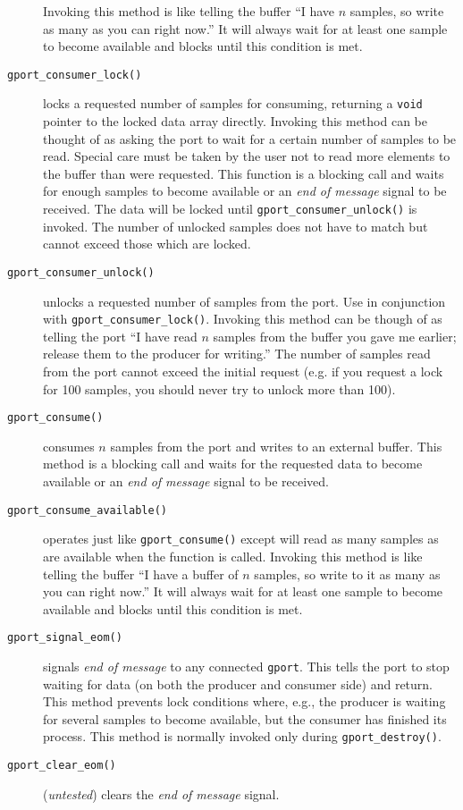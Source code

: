 \begin{description}
    Invoking this method is like telling the buffer ``I have $n$ samples, so
    write as many as you can right now.''
    It will always wait for at least one sample to become available and blocks
    until this condition is met.
\item[{\tt gport\_consumer\_lock()}]
    locks a requested number of samples for consuming, returning a {\tt void}
    pointer to the locked data array directly.
    Invoking this method can be thought of as asking the port to wait for a
    certain number of samples to be read.
    Special care must be taken by the user not to read more elements to the
    buffer than were requested.
    This function is a blocking call and waits for enough samples to become
    available or an {\it end of message} signal to be received.
    The data will be locked until {\tt gport\_consumer\_unlock()} is invoked.
    The number of unlocked samples does not have to match but cannot exceed
    those which are locked.
\item[{\tt gport\_consumer\_unlock()}]
    unlocks a requested number of samples from the port.
    Use in conjunction with {\tt gport\_consumer\_lock()}.
    Invoking this method can be though of as telling the port ``I have read
    $n$ samples from the buffer you gave me earlier; release them to the
    producer for writing.''
    The number of samples read from the port cannot exceed the initial
    request (e.g. if you request a lock for 100 samples, you should never try
    to unlock more than 100).
\item[{\tt gport\_consume()}]
    consumes $n$ samples from the port and writes to an external buffer.
    This method is a blocking call and waits for the requested data to become
    available or an {\it end of message} signal to be received.
\item[{\tt gport\_consume\_available()}]
    operates just like {\tt gport\_consume()} except will read as many samples
    as are available when the function is called.
    Invoking this method is like telling the buffer ``I have a buffer of $n$
    samples, so write to it as many as you can right now.''
    It will always wait for at least one sample to become available and blocks
    until this condition is met.
\item[{\tt gport\_signal\_eom()}]
    signals {\it end of message} to any connected {\tt gport}.
    This tells the port to stop waiting for data (on both the producer and
    consumer side) and return.
    This method prevents lock conditions where, e.g., the producer is waiting
    for several samples to become available, but the consumer has finished its
    process.
    This method is normally invoked only during {\tt gport\_destroy()}.
\item[{\tt gport\_clear\_eom()}]
    ({\it untested})
    clears the {\it end of message} signal.
\end{description}


